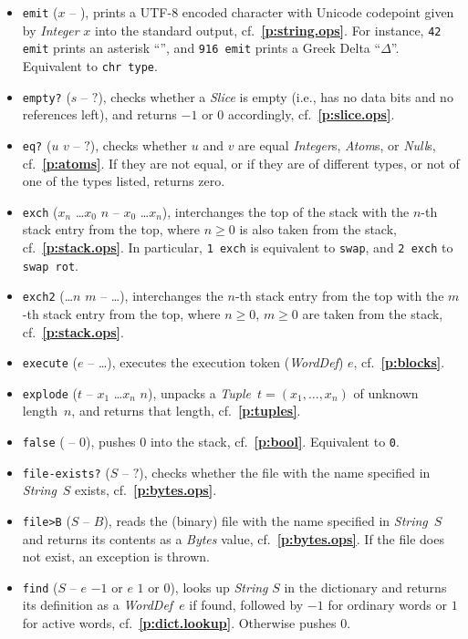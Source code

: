 \documentclass[12pt,oneside]{article}
\def\refpoint#1{{\rm\textbf{\ref{#1}}}}
\let\ptref=\refpoint
\begin{document}
\begin{itemize}
\item {\tt emit} ($x$ -- ), prints a UTF-8 encoded character with Unicode codepoint given by {\em Integer\/} $x$ into the standard output, cf.~\ptref{p:string.ops}. For instance, {\tt 42 emit} prints an asterisk ``{\tt *}'', and {\tt 916 emit} prints a Greek Delta ``{\tt $\Delta$}''. Equivalent to {\tt chr type}.
\item {\tt empty?} ($s$ -- $?$), checks whether a {\em Slice\/} is empty (i.e., has no data bits and no references left), and returns $-1$ or $0$ accordingly, cf.~\ptref{p:slice.ops}.
\item {\tt eq?} ($u$ $v$ -- $?$), checks whether $u$ and $v$ are equal {\em Integer\/}s, {\em Atom\/}s, or {\em Null\/}s, cf.~\ptref{p:atoms}. If they are not equal, or if they are of different types, or not of one of the types listed, returns zero.
\item {\tt exch} ($x_n$ \dots $x_0$ $n$ -- $x_0$ \dots $x_n$), interchanges the top of the stack with the $n$-th stack entry from the top, where $n\geq0$ is also taken from the stack, cf.~\ptref{p:stack.ops}. In particular, {\tt 1 exch} is equivalent to {\tt swap}, and {\tt 2 exch} to {\tt swap rot}.
\item {\tt exch2} (\dots $n$ $m$ -- \dots), interchanges the $n$-th stack entry from the top with the $m$-th stack entry from the top, where $n\geq0$, $m\geq0$ are taken from the stack, cf.~\ptref{p:stack.ops}.
\item {\tt execute} ($e$ -- \dots), executes the execution token ({\em WordDef\/}) $e$, cf.~\ptref{p:blocks}.
\item {\tt explode} ($t$ -- $x_1$ \dots $x_n$ $n$), unpacks a {\em Tuple\/}~$t=(x_1,\ldots,x_n)$ of unknown length~$n$, and returns that length, cf.~\ptref{p:tuples}.
\item {\tt false} ( -- $0$), pushes $0$ into the stack, cf.~\ptref{p:bool}. Equivalent to {\tt 0}.
\item {\tt file-exists?} ($S$ -- $?$), checks whether the file with the name specified in {\em String\/}~$S$ exists, cf.~\ptref{p:bytes.ops}.
\item {\tt file>B} ($S$ -- $B$), reads the (binary) file with the name specified in {\em String\/}~$S$ and returns its contents as a {\em Bytes\/} value, cf.~\ptref{p:bytes.ops}. If the file does not exist, an exception is thrown.
\item {\tt find} ($S$ -- $e$ $-1$ or $e$ $1$ or $0$), looks up {\em String\/} $S$ in the dictionary and returns its definition as a {\em WordDef\/}~$e$ if found, followed by $-1$ for ordinary words or $1$ for active words, cf.~\ptref{p:dict.lookup}. Otherwise pushes $0$.

\end{itemize}
\end{document}

